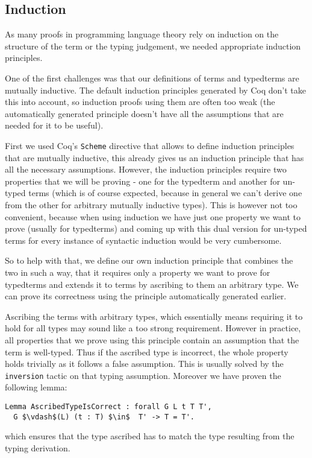 \documentclass[runningheads]{article}
\begin{document}
\subsection{Induction}

As many proofs in programming language theory rely on induction on the structure of the term or the typing judgement, we needed appropriate induction principles.

One of the first challenges was that our definitions of terms and typedterms are mutually inductive. The default induction principles generated by Coq don't take this into account, so induction proofs using them are often too weak (the automatically generated principle doesn't have all the assumptions that are needed for it to be useful).

First we used Coq's \verb|Scheme| directive that allows to define induction principles that are mutually inductive, this already gives us an induction principle that has all the necessary assumptions. However, the induction principles require two properties that we will be proving - one for the typedterm and another for un-typed terms (which is of course expected, because in general we can't derive one from the other for arbitrary mutually inductive types). This is however not too convenient, because when using induction we have just one property we want to prove (usually for typedterms) and coming up with this dual version for un-typed terms for every instance of syntactic induction would be very cumbersome.

So to help with that, we define our own induction principle that combines the two in such a way, that it requires only a property we want to prove for typedterms and extends it to terms by ascribing to them an arbitrary type. We can prove its correctness using the principle automatically generated earlier.

Ascribing the terms with arbitrary types, which essentially means requiring it to hold for all types may sound like a too strong requirement. However in practice, all properties that we prove using this principle contain an assumption that the term is well-typed. Thus if the ascribed type is incorrect, the whole property holds trivially as it follows a false assumption. This is usually solved by the \verb|inversion| tactic on that typing assumption. Moreover we have proven the following lemma:
\begin{lstlisting}[mathescape=true]
Lemma AscribedTypeIsCorrect : forall G L t T T',
  G $\vdash$(L) (t : T) $\in$  T' -> T = T'.
\end{lstlisting}
which ensures that the type ascribed has to match the type resulting from the typing derivation.
\end{document}
